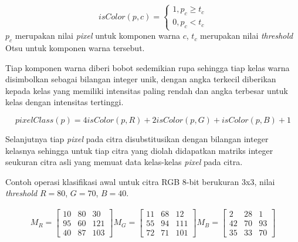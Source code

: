 \documentclass[laporan.tex]{subfiles}
\begin{document}
\begin{equation}
	isColor(p,c) = \begin{cases}
			1, p_c \geq t_c \\
			0, p_c < t_c
		\end{cases}
\end{equation}
$p_c$ merupakan nilai \emph{pixel} untuk komponen warna $c$, $t_c$ merupakan nilai \emph{threshold} Otsu untuk komponen warna tersebut.

Tiap komponen warna diberi bobot sedemikian rupa sehingga tiap kelas warna disimbolkan sebagai bilangan integer unik, dengan angka terkecil diberikan kepada kelas yang memiliki intensitas paling rendah dan angka terbesar untuk kelas dengan intensitas tertinggi.

\begin{equation}
	pixelClass(p) = 4 isColor(p,R) + 2 isColor(p,G) + isColor(p,B) + 1
\label{classcol}
\end{equation}

Selanjutnya tiap \emph{pixel} pada citra disubstitusikan dengan bilangan integer kelasnya sehingga untuk tiap citra yang diolah didapatkan matriks integer seukuran citra asli yang memuat data kelas-kelas \emph{pixel} pada citra.

Contoh operasi klasifikasi awal untuk citra RGB 8-bit berukuran 3x3, nilai \emph{threshold} $R=80$, $G=70$, $B=40$.

\begin{align*}
M_R = \begin{bmatrix}
10 & 80 & 30 \\
95 & 60 & 121 \\
40 & 87 & 103
\end{bmatrix} 
M_G = \begin{bmatrix}
11 & 68 & 12 \\
55 & 94 & 111 \\
72 & 71 & 101
\end{bmatrix} 
M_B = \begin{bmatrix}
2 & 28 & 1 \\
42 & 70 & 93 \\
35 & 33 & 70
\end{bmatrix}
\end{align*}
\end{document}
